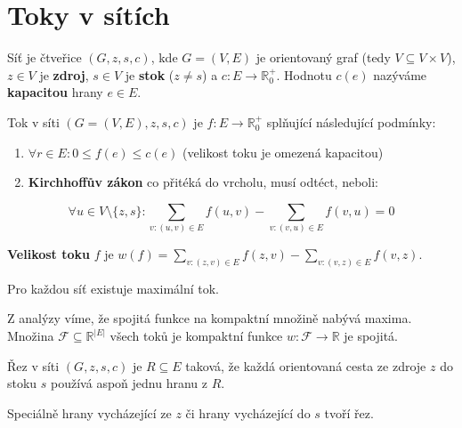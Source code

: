 \chapter{Toky v sítích}

\begin{definice}
	Síť je čtveřice $(G, z, s, c)$, kde $G = (V, E)$ je orientovaný graf (tedy $V \subseteq V \times V$), $z \in V$ je \textbf{zdroj}, $s \in V$ je \textbf{stok} ($z \neq s$) a $c: E \to \mathbb{R}_{0}^{+}$. Hodnotu $c(e)$ nazýváme \textbf{kapacitou} hrany $e \in E$.
\end{definice}

\begin{definice}
	Tok v síti $(G = (V, E), z, s, c)$ je $f: E \to \mathbb{R}_{0}^{+}$ splňující následující podmínky:
	
	\begin{enumerate}
		\item $\forall r \in E : 0 \leq f(e) \leq c(e)$ (velikost toku je omezená kapacitou)
		\item \textbf{Kirchhoffův zákon} co přitéká do vrcholu, musí odtéct, neboli:
	\end{enumerate}
	
	$$
	\forall u \in V \setminus \{ z, s\}: \sum_{v:(u,v) \in E} f(u,v) - \sum_{v:(v, u) \in E} f(v,u) = 0
	$$
\end{definice}

\begin{definice}
	\textbf{Velikost toku} $f$ je $w(f) = \sum_{v:(z,v) \in E} f(z,v) - \sum_{v:(v, z) \in E} f(v,z)$.
\end{definice}

\begin{tvrz}
	Pro každou síť existuje maximální tok.
\end{tvrz}

\begin{dukaz}[Náčrt]
	Z analýzy víme, že spojitá funkce na kompaktní množině nabývá maxima. Množina $\mathcal{F} \subseteq \mathbb{R}^{|E|}$ všech toků je kompaktní funkce $w: \mathcal{F} \to \mathbb{R}$ je spojitá.
\end{dukaz}

\begin{definice}
	Řez v síti $(G, z, s, c)$ je $R \subseteq E$ taková, že každá orientovaná cesta ze zdroje $z$ do stoku $s$ používá aspoň jednu hranu z $R$.
\end{definice}

Speciálně hrany vycházející ze $z$ či hrany vycházející do $s$ tvoří řez.

